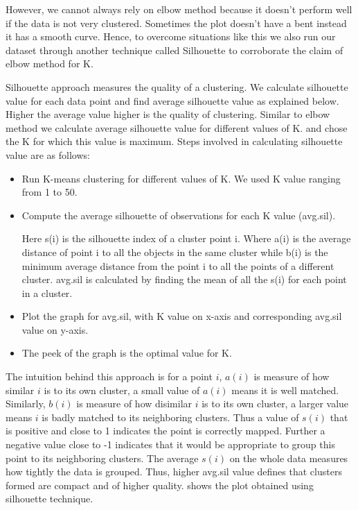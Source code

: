  However, we cannot always rely on elbow method because it doesn't perform well if the data is not very clustered. Sometimes the plot doesn't have a bent instead it has a smooth curve. Hence, to overcome situations like this we also run our dataset through another technique called Silhouette to corroborate the claim of elbow method for K.
 
 Silhouette approach measures the quality of a clustering. We calculate silhouette value for each data point and find average silhouette value as explained below. Higher the average value higher is the quality of clustering. Similar to elbow method we calculate average silhouette value for different values of K. and chose the K for which this value is maximum. Steps involved in calculating silhouette value are as follows:
 	
		\begin{itemize}
		\item Run K-means clustering for different values of K. We used K value ranging from 1 to 50.
		\item Compute the average silhouette of observations for each K value (avg.sil).
		
		\begin{center}
		\end{center}
		Here s(i) is the silhouette index of a cluster point i. Where a(i) is the average distance of point i to all the objects in the same cluster while b(i) is the minimum average distance from the point i to all the points of a different cluster. avg.sil is calculated by finding the mean of all the s(i) for each point in a cluster.
		
		\item Plot the graph for avg.sil, with K value on x-axis and corresponding avg.sil value on y-axis.
		\item The peek of the graph is the optimal value for K.
	\end{itemize}
 
  The intuition behind this approach is for a point $i$, $ a(i)$ is  measure of how similar $i$ is to its own cluster, a small value of $ a(i)$ means it is well matched. Similarly, $b(i)$ is measure of how disimilar $i$ is to its own cluster, a larger value means $i$ is badly matched to its neighboring clusters. Thus a value of $s(i)$ that is positive and close to 1 indicates the point is correctly mapped. Further a negative value close to -1 indicates that it would be appropriate to group this point to its neighboring clusters. The average $s(i)$ on the whole data measures how tightly the data is grouped. Thus, higher avg.sil value defines that clusters formed are compact and of higher quality.  shows the plot obtained using silhouette technique. 
 

